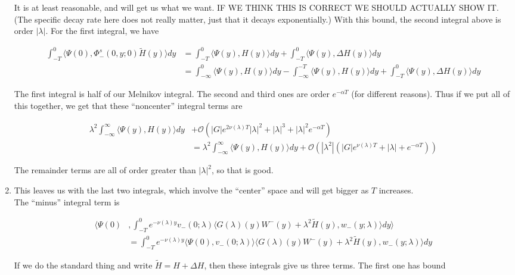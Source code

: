\documentclass[12pt]{article}
\begin{document}
\begin{enumerate}
It is at least reasonable, and will get us what we want. IF WE THINK THIS IS CORRECT WE SHOULD ACTUALLY SHOW IT. (The specific decay rate here does not really matter, just that it decays exponentially.) With this bound, the second integral above is order $|\lambda|$. For the first integral, we have 

\begin{align*}
\int_{-T}^0 \langle \Psi(0), \Phi^s_-(0, y; 0) \tilde{H}(y) \rangle dy &= 
\int_{-T}^0 \langle \Psi(y), H(y) \rangle dy + \int_{-T}^0 \langle \Psi(y), \Delta H(y) \rangle dy \\
&= \int_{-\infty}^0 \langle \Psi(y), H(y) \rangle dy - \int_{-\infty}^{-T} \langle \Psi(y), H(y) \rangle dy + \int_{-T}^0 \langle \Psi(y), \Delta H(y) \rangle dy 
\end{align*}

The first integral is half of our Melnikov integral. The second and third ones are order $e^{-\alpha T}$ (for different reasons). Thus if we put all of this together, we get that these ``noncenter'' integral terms are

\begin{align*}
\lambda^2 \int_{-\infty}^\infty \langle \Psi(y), H(y) \rangle dy &+ \mathcal{O}( |G| e^{2 \nu(\lambda)T}|\lambda|^2 + |\lambda|^3 + |\lambda|^2 e^{-\alpha T}) \\
&= \lambda^2 \int_{-\infty}^\infty \langle \Psi(y), H(y) \rangle dy + \mathcal{O}( |\lambda^2|(|G| e^{\nu(\lambda)T} + |\lambda|+ e^{-\alpha T}))
\end{align*}

The remainder terms are all of order greater than $|\lambda|^2$, so that is good.

\item This leaves us with the last two integrals, which involve the ``center'' space and will get bigger as $T$ increases.\\

The ``minus'' integral term is

\begin{align*}
\langle \Psi(0) &, \int_{-T}^0 
e^{-\nu(\lambda)y} v_-(0; \lambda) \langle G(\lambda)(y)W^-(y) + \lambda^2 \tilde{H}(y), w_-(y; \lambda) \rangle dy \rangle \\
&= \int_{-T}^0 e^{-\nu(\lambda)y} \langle \Psi(0),v_-(0; \lambda) \rangle
\langle G(\lambda)(y)W^-(y) + \lambda^2 \tilde{H}(y), w_-(y; \lambda) \rangle dy 
\end{align*}

If we do the standard thing and write $\tilde{H} = H + \Delta H$, then these integrals give us three terms. The first one has bound


\end{enumerate}
\end{document}
